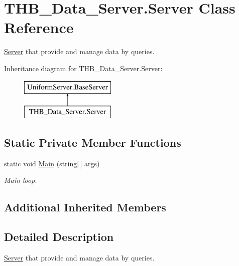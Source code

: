 \hypertarget{class_t_h_b___data___server_1_1_server}{}\section{T\+H\+B\+\_\+\+Data\+\_\+\+Server.\+Server Class Reference}
\label{class_t_h_b___data___server_1_1_server}


\mbox{\hyperlink{class_t_h_b___data___server_1_1_server}{Server}} that provide and manage data by queries.  


Inheritance diagram for T\+H\+B\+\_\+\+Data\+\_\+\+Server.\+Server\+:\begin{figure}[H]
\begin{center}
\leavevmode
\includegraphics[height=2.000000cm]{dc/d42/class_t_h_b___data___server_1_1_server}
\end{center}
\end{figure}
\subsection*{Static Private Member Functions}
\begin{DoxyCompactItemize}
\item 
static void \mbox{\hyperlink{class_t_h_b___data___server_1_1_server_a87515fb7b3422af002d33dd3fbe8f4e9}{Main}} (string\mbox{[}$\,$\mbox{]} args)
\begin{DoxyCompactList}\small\item\em Main loop. \end{DoxyCompactList}\end{DoxyCompactItemize}
\subsection*{Additional Inherited Members}


\subsection{Detailed Description}
\mbox{\hyperlink{class_t_h_b___data___server_1_1_server}{Server}} that provide and manage data by queries. 



